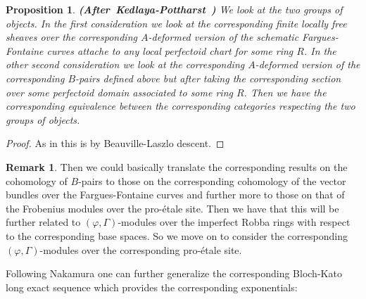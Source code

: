\documentclass[12pt]{amsart}
\newtheorem{proposition}[theorem]{Proposition}
\theoremstyle{definition}
\newtheorem{remark}[theorem]{Remark}
\numberwithin{equation}{section}
\begin{document}
	



\begin{proposition} \mbox{\bf{(After Kedlaya-Pottharst \cite[Theorem 2.18]{KP})}}
We look at the two groups of objects. In the first consideration we look at the corresponding finite locally free sheaves over the corresponding $A$-deformed version of the schematic Fargues-Fontaine curves attache to any local perfectoid chart for some ring $R$. In the other second consideration we look at the corresponding $A$-deformed version of the corresponding $B$-pairs defined above but after taking the corresponding section over some perfectoid domain associated to some ring $R$. Then we have the corresponding equivalence between the corresponding categories respecting the two groups of objects.	
\end{proposition} 


\begin{proof}
As in \cite[Theorem 2.18]{KP} this is by Beauville-Laszlo descent.	
\end{proof}


\begin{remark}
\indent Then we could basically translate the corresponding results on the cohomology of $B$-pairs to those on the corresponding cohomology of the vector bundles over the Fargues-Fontaine curves and further more to those on that of the Frobenius modules over the pro-\'etale site. Then we have that this will be further related to $(\varphi,\Gamma)$-modules over the imperfect Robba rings with respect to the corresponding base spaces. So we move on to consider the corresponding $(\varphi,\Gamma)$-modules over the corresponding pro-\'etale site.	
\end{remark}



\indent Following Nakamura one can further generalize the corresponding Bloch-Kato long exact sequence which provides the corresponding exponentials:
\end{document}
